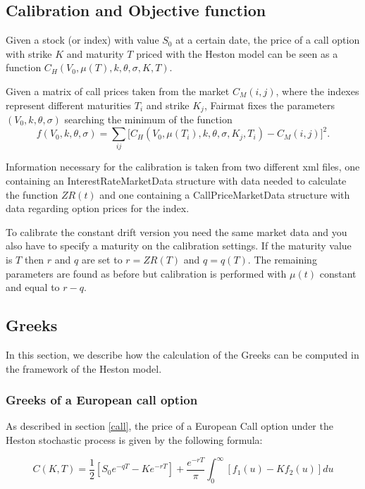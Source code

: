 \subsection{Calibration and Objective function}

Given a stock (or index) with value $S_0$ at a certain date, the price of a call option with strike $K$ and maturity $T$ priced with the Heston model can be seen as a function $C_H(V_0, \mu(T), k, \theta, \sigma, K, T)$.

Given a matrix of call prices taken from the market $C_M(i,j)$, where the indexes represent different maturities $T_i$ and strike $K_j$, Fairmat fixes the parameters $(V_0, k, \theta, \sigma)$ searching the minimum of the function
\begin{equation}
f(V_0, k, \theta, \sigma) = \sum_{ij}\Big[C_H(V_0, \mu(T_i), k, \theta, \sigma, K_j, T_i) - C_M(i,j)\Big]^2.
\end{equation}

Information necessary for the calibration is taken from two different xml files, one containing an InterestRateMarketData  structure with data needed to calculate the function $ZR(t)$ and one containing a CallPriceMarketData structure with data regarding option prices for the index.

To calibrate the constant drift version you need the same market data and you also have to specify a maturity on the calibration settings. If the maturity value is $T$ then $r$ and $q$ are set to $r = ZR(T)$ and $q = q(T)$. The remaining parameters are found as before but calibration is performed with $\mu(t)$ constant and equal to $r-q$.




\subsection{Greeks}
In this section, we describe how the calculation of the Greeks can be computed in the framework of the Heston model. 


\subsubsection{Greeks of a European call option}
As described in section \ref{call}, the price of a European Call option under the Heston stochastic process is given by the following formula:

$$
C(K,T) = \frac{1}{2}\left[S_0e^{-q T} - Ke^{-r T}\right] + \frac{e^{-r T}}{\pi}\int_0^{\infty}\left[f_1(u) - Kf_2(u)\right]du
$$


